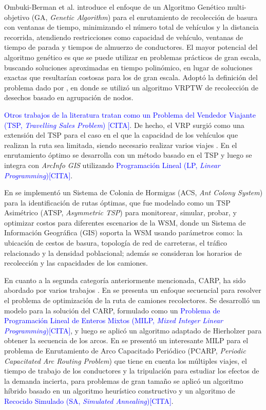 \documentclass[conference,compsoc]{IEEEtran}
\begin{document}
Ombuki-Berman et al. \cite{Ombuki-Berman2007WASTEALGORITHMS} introduce el enfoque de un Algoritmo Genético multi-objetivo (GA, \textit{Genetic Algorithm}) para el enrutamiento de recolección de basura con ventanas de tiempo, minimizando el número total de vehículos y la distancia recorrida, atendiendo restricciones como capacidad de vehículo, ventanas de tiempo de parada y tiempos de almuerzo de conductores. El mayor potencial del algoritmo genético es que se puede utilizar en problemas prácticos de gran escala, buscando soluciones aproximadas en tiempo polinómico, en lugar de soluciones exactas que resultarían costosas para los de gran escala. Adoptó la definición del problema dado por \cite{Kim2006WasteWindows}, en donde se utilizó un algoritmo VRPTW de recolección de desechos basado en agrupación de nodos.

\textcolor{blue}{Otros trabajos de la literatura tratan como un Problema del Vendedor Viajante (TSP, \textit{Travelling Sales Problem}) [CITA]}. De hecho, el VRP surgió como una extensión del TSP para el caso en el que la capacidad de los vehículos que realizan la ruta sea limitada, siendo necesario realizar varios viajes \cite{CalvinoM2011CooperacionPanoramica}. En \cite{Billa2014GISOptimization} el enrutamiento óptimo se desarrolla con un método basado en el TSP y luego se integra con \textit{ArcInfo GIS} utilizando \textcolor{blue}{Programación Lineal (LP, \textit{Linear Programming})[CITA]}.

En \cite{Karadimas2007OptimalAlgorithm} se implementó un Sistema de Colonia de Hormigas (ACS, \textit{Ant Colony System}) para la identificación de rutas óptimas, que fue modelado como un TSP Asimétrico (ATSP, \textit{Asymmetric TSP}) para monitorear, simular, probar, y optimizar costos para diferentes escenarios de la WSM, donde un Sistema de Información Geográfica (GIS) soporta la WSM usando parámetros como: la ubicación de cestos de basura, topología de red de carreteras, el tráfico relacionado y la densidad poblacional; además se consideran los horarios de recolección y las capacidades de los camiones.

En cuanto a la segunda categoría anteriormente mencionada, CARP, ha sido abordado por varios trabajos \cite{Vecchi2016ACollection,Tirkolaee2018ATime,Braier2017AnArgentina}. En \cite{Vecchi2016ACollection} se presenta un enfoque secuencial para resolver el problema de optimización de la ruta de camiones recolectores. Se desarrolló un modelo para la solución del CARP, formulado como un \textcolor{blue}{Problema de Programación Lineal de Enteros Mixtos (MILP, \textit{Mixed Integer Linear Programming})[CITA]}, y luego se aplicó un algoritmo adaptado de Hierholzer para obtener la secuencia de los arcos. En \cite{Tirkolaee2018ATime} se presentó un interesante MILP para el problema de Enrutamiento de Arco Capacitado Periódico (PCARP, \textit{Periodic Capacitated Arc Routing Problem}) que tiene en cuenta los múltiples viajes, el tiempo de trabajo de los conductores y la tripulación para estudiar los efectos de la demanda incierta, para problemas de gran tamaño se aplicó un algoritmo híbrido basado en un algoritmo heurístico constructivo y un algoritmo de \textcolor{blue}{Recocido Simulado (SA, \textit{Simulated Annealing})[CITA]}.
\end{document}
